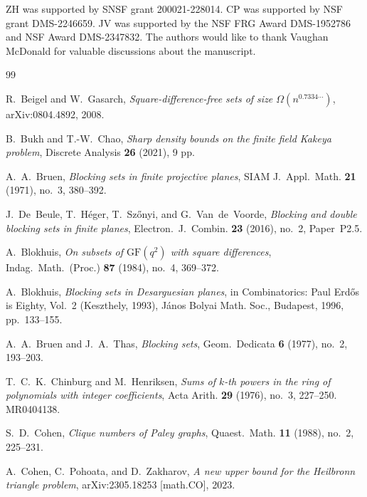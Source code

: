 \documentclass[12pt,reqno]{amsart}
\theoremstyle{plain}
\theoremstyle{definition}
\newcommand{\1}{\mathbf{1}}
\begin{document}
\medskip
{} ZH was supported by SNSF grant 200021-228014. CP was supported by NSF grant DMS-2246659. JV was supported by the NSF FRG Award DMS-1952786 and NSF Award DMS-2347832. The authors would like to thank Vaughan McDonald for valuable discussions about the manuscript.

\begin{thebibliography}{99}

R.~Beigel and W.~Gasarch,
\newblock \emph{Square-difference-free sets of size $\Omega(n^{0.7334\cdots})$},
\newblock arXiv:0804.4892, 2008.

B.~Bukh and T.-W.~Chao,
\newblock \emph{Sharp density bounds on the finite field Kakeya problem},
\newblock Discrete Analysis \textbf{26} (2021), 9 pp.

A.~A.~Bruen,
\newblock \emph{Blocking sets in finite projective planes},
\newblock SIAM J.\ Appl.\ Math. \textbf{21} (1971), no.~3, 380--392.

J.~De~Beule, T.~H\'eger, T.~Sz\H{o}nyi, and G.~Van~de~Voorde,
\newblock \emph{Blocking and double blocking sets in finite planes},
\newblock Electron.\ J.\ Combin. \textbf{23} (2016), no.~2, Paper~P2.5.

A.~Blokhuis,
\newblock \emph{On subsets of $\mathrm{GF}(q^{2})$ with square differences},
\newblock Indag.\ Math.\ (Proc.) \textbf{87} (1984), no.~4, 369--372.

A.~Blokhuis,
\newblock \emph{Blocking sets in Desarguesian planes},
\newblock in Combinatorics: Paul Erd\H{o}s is Eighty, Vol.~2 (Keszthely, 1993),
J\'anos Bolyai Math. Soc., Budapest, 1996, pp.~133--155.

A.~A.~Bruen and J.~A.~Thas,
\newblock \emph{Blocking sets},
\newblock Geom.\ Dedicata \textbf{6} (1977), no.~2, 193--203.

T.~C.~K.~Chinburg and M.~Henriksen,
\newblock \emph{Sums of $k$-th powers in the ring of polynomials with integer coefficients},
\newblock Acta Arith. \textbf{29} (1976), no.~3, 227--250. MR0404138.

S.~D.~Cohen,
\newblock \emph{Clique numbers of Paley graphs},
\newblock Quaest.\ Math. \textbf{11} (1988), no.~2, 225--231.

A.~Cohen, C.~Pohoata, and D.~Zakharov,
\newblock \emph{A new upper bound for the Heilbronn triangle problem},
\newblock arXiv:2305.18253 [math.CO], 2023.


\end{thebibliography}
\end{document}
